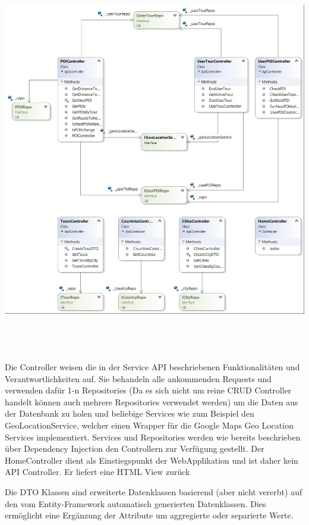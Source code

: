 \documentclass[a4paper,10pt,xetex]{article}
\begin{document}
\begin{center}
	\includegraphics[width=6.5in,height=6.6925in]{klassendiagramm_backend1.jpg}
\end{center}


	Die Controller weisen die in der Service API beschriebenen Funktionalit\"aten und Verantwortlichkeiten auf. Sie
	behandeln alle ankommenden Requests und verwenden daf\"ur 1-n Repositories (Da es sich nicht um reine CRUD Controller
	handelt k\"onnen auch mehrere Repositories verwendet werden) um die Daten aus der Datenbank zu holen und beliebige
	Services wie zum Beispiel den GeoLocationService, welcher einen Wrapper f\"ur die Google Maps Geo Location Services
	implementiert. Services und Repositories werden wie bereits beschrieben \"uber Dependency Injection den Controllern zur
	Verf\"ugung gestellt. Der HomeController dient als Einstiegspunkt der WebApplikation und ist daher kein API Controller.
	Er liefert eine HTML View zur\"uck


	Die DTO Klassen sind erweiterte Datenklassen basierend (aber nicht vererbt) auf den vom Entity-Framework automatisch
	generierten Datenklassen. Dies erm\"oglicht eine Erg\"anzung der Attribute um aggregierte oder separierte Werte.
\end{document}

